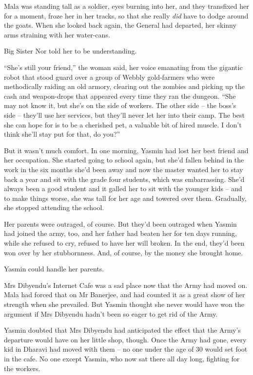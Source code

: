 Mala was standing tall as a soldier, eyes burning into her, and
they transfixed her for a moment, froze her in her tracks, so that
she really \emph{did} have to dodge around the goats. When she
looked back again, the General had departed, her skinny arms
straining with her water-cans.

Big Sister Nor told her to be understanding.

``She's still your friend,'' the woman said, her voice emanating from
the gigantic robot that stood guard over a group of Webbly
gold-farmers who were methodically raiding an old armory, clearing
out the zombies and picking up the cash and weapon-drops that
appeared every time they ran the dungeon. ``She may not know it, but
she's on the side of workers. The other side -- the boss's side --
they'll use her services, but they'll never let her into their
camp. The best she can hope for is to be a cherished pet, a
valuable bit of hired muscle. I don't think she'll stay put for
that, do you?''

But it wasn't much comfort. In one morning, Yasmin had lost her
best friend and her occupation. She started going to school again,
but she'd fallen behind in the work in the six months she'd been
away and now the master wanted her to stay back a year and sit with
the grade four students, which was embarrassing. She'd always been
a good student and it galled her to sit with the younger kids --
and to make things worse, she was tall for her age and towered over
them. Gradually, she stopped attending the school.

Her parents were outraged, of course. But they'd been outraged when
Yasmin had joined the army, too, and her father had beaten her for
ten days running, while she refused to cry, refused to have her
will broken. In the end, they'd been won over by her stubbornness.
And, of course, by the money she brought home.

Yasmin could handle her parents.

Mrs Dibyendu's Internet Cafe was a sad place now that the Army had
moved on. Mala had forced that on Mr Banerjee, and had counted it
as a great show of her strength when she prevailed. But Yasmin
thought she never would have won the argument if Mrs Dibyendu
hadn't been so eager to get rid of the Army.

Yasmin doubted that Mrs Dibyendu had anticipated the effect that
the Army's departure would have on her little shop, though. Once
the Army had gone, every kid in Dharavi had moved with them -- no
one under the age of 30 would set foot in the cafe. No one except
Yasmin, who now sat there all day long, fighting for the workers.


